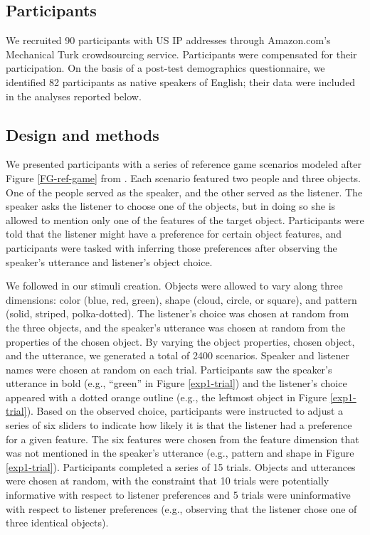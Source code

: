 \documentclass[10pt,a4paper]{article}
\begin{document}
\subsection{Participants}

We recruited 90 participants with US IP addresses through Amazon.com's Mechanical Turk crowdsourcing service. Participants were compensated for their participation. On the basis of a post-test demographics questionnaire, we identified 82 participants as native speakers of English; their data were included in the analyses reported below.

\subsection{Design and methods}

We presented participants with a series of reference game scenarios modeled after Figure \ref{FG-ref-game} from . Each scenario featured two people and three objects. One of the people served as the speaker, and the other served as the listener. The speaker asks the listener to choose one of the objects, but in doing so she is allowed to mention only one of the features of the target object. Participants were told that the listener might have a preference for certain object features, and participants were tasked with inferring those preferences after observing the speaker's utterance and listener's object choice.

We followed  in our stimuli creation. Objects were allowed to vary along three dimensions: color (blue, red, green), shape (cloud, circle, or square), and pattern (solid, striped, polka-dotted). The listener's choice was chosen at random from the three objects, and the speaker's utterance was chosen at random from the properties of the chosen object. By varying the object properties, chosen object, and the utterance, we generated a total of 2400 scenarios. Speaker and listener names were chosen at random on each trial. Participants saw the speaker's utterance in bold (e.g., ``green'' in Figure \ref{exp1-trial}) and the listener's choice appeared with a dotted orange outline (e.g., the leftmost object in Figure \ref{exp1-trial}). Based on the observed choice, participants were instructed to adjust a series of six sliders to indicate how likely it is that the listener had a preference for a given feature. The six features were chosen from the feature dimension that was not mentioned in the speaker's utterance (e.g., pattern and shape in Figure \ref{exp1-trial}). Participants completed a series of 15 trials. Objects and utterances were chosen at random, with the constraint that 10 trials were potentially informative with respect to listener preferences and 5 trials were uninformative with respect to listener preferences (e.g., observing that the listener chose one of three identical objects). 
\end{document}
